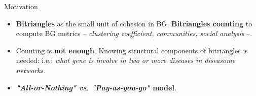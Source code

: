 \begin{frame}[fragile]{Motivation}
    \begin{itemize}
      \setlength\itemsep{1.5em}
      \item {\color{light}\textbf{Bitriangles} as the small unit of cohesion in BG. \textbf{Bitriangles counting} to compute BG metrics -- \emph{clustering coefficient, communities, social analysis} --.}
      \item {\color{light}Counting is \textbf{not enough}. Knowing structural components of bitriangles is needed: i.e.: \emph{what gene is involve in two or more diseases in diseasome networks}.}
      \item \textbf{\emph{"All-or-Nothing" vs. "Pay-as-you-go"} model}. 
    \end{itemize}
\end{frame}

